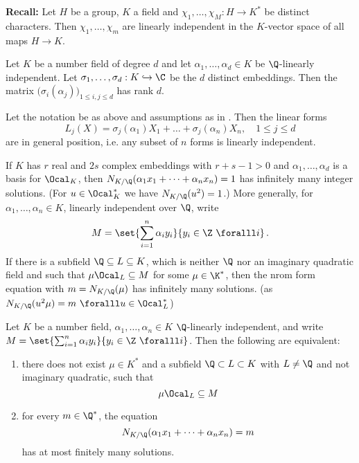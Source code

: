 
\textbf{Recall:} Let \( H \) be a group, \( K \) a field and \( \chi_1, \dotsc, \chi_M: H \to K^* \) be distinct characters.
Then \( \chi_1, \dotsc, \chi_m \) are linearly independent in the \( K \)-vector space of all maps \( H \to K \).

\begin{cor*}
	Let \( K \) be a number field of degree \( d \) and let \( \alpha_1, \dotsc, \alpha_d \in K \) be \( \Q \)-linearly independent.
	Let \( \sigma_1, \dotsc, \sigma_d: K \hookrightarrow \C \) be the \( d \) distinct embeddings.
	Then the matrix \( \big( \sigma_i (\alpha_j) \big)_{1 \leq i,j \leq d} \) has rank \( d \).
\end{cor*}

\begin{lem}
	Let the notation be as above and assumptions as in .
	Then the linear forms
	\[ L_j(X) = \sigma_j(\alpha_1)X_1 + \dots + \sigma_j(\alpha_n)X_n, \quad 1 \leq j \leq d \]
	are in general position, i.e. any subset of \( n \) forms is linearly independent.
\end{lem}

\begin{exmp*}
	If \( K \) has \( r \) real and \( 2s \) complex embeddings with \( r+s-1>0 \) and \( \alpha_1, \dotsc, \alpha_d \) is a basis for \( \Ocal_K \), then \( N_{K/\Q}(\alpha_1 x_1 + \dots + \alpha_n x_n) = 1 \) has infinitely many integer solutions.
	(For \( u \in \Ocal_K^* \) we have \( N_{K/\Q}(u^2)=1 \).)
	More generally, for \( \alpha_1, \dotsc, \alpha_n \in K \), linearly independent over \( \Q \), write
	\[ M = \set{\sum_{i=1}^{n} \alpha_i y_i}{y_i \in \Z \ \foralll i} \,. \]
	If there is a subfield \( \Q \subseteq L \subseteq K \), which is neither \( \Q \) nor an imaginary quadratic field and such that \( \mu \Ocal_L \subseteq M \) for some \( \mu \in \K^* \), then the nrom form equation with \( m = N_{K/\Q}(\mu) \) has infinitely many solutions.
	(as \( N_{K/\Q}(u^2 \mu) = m \ \foralll u \in \Ocal_L^* \))
\end{exmp*}

\begin{thm*}[Schmidt, 1972]
	Let \( K \) be a number field, \( \alpha_1, \dotsc, \alpha_n \in K \) \( \Q \)-linearly independent, and write \( M = \set{\sum_{i=1}^{n} \alpha_i y_i}{y_i \in \Z \ \foralll i} \).
	Then the following are equivalent:
	\begin{enumerate}[label=(\roman*)]
		\item there does not exist \( \mu \in K^* \) and a subfield \( \Q \subset L \subset K \) with \( L \neq \Q \) and not imaginary quadratic, such that
			\[ \mu \Ocal_L \subseteq M \]
		\item for every \( m \in \Q^* \), the equation
			\[ N_{K/\Q}(\alpha_1 x_1 + \dots + \alpha_n x_n) = m \]
			has at most finitely many solutions.
	\end{enumerate}
\end{thm*}

